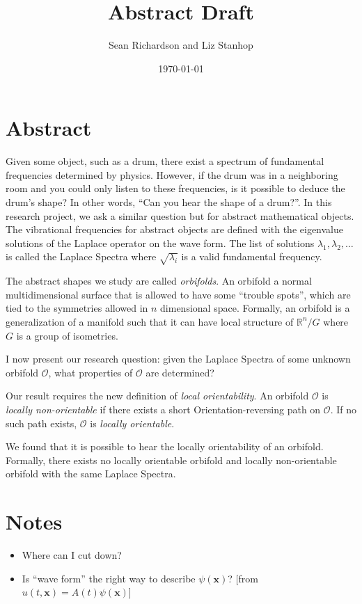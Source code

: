 \documentclass{article}
\begin{document}
\date{\today}
\title{Abstract Draft}
\author{Sean Richardson and Liz Stanhop}
\maketitle

\section{Abstract}

\hspace{\parindent} Given some object, such as a drum, there exist a spectrum
of fundamental frequencies determined by physics. However, if the drum was in a
neighboring room and you could only listen to these frequencies, is it possible
to deduce the drum's shape? In other words, ``Can you hear the shape of a
drum?''. In this research project, we ask a similar question but for abstract
mathematical objects. The vibrational frequencies for abstract objects are
defined with the eigenvalue solutions of the Laplace operator on the wave form.
The list of solutions $\lambda_1, \lambda_2, \dots$ is called the Laplace
Spectra where $\sqrt{\lambda_i}$ is a valid fundamental frequency. 

The abstract shapes we study are called \emph{orbifolds}. An orbifold a normal multidimensional surface that is allowed to have some ``trouble spots'', which are tied to the symmetries allowed in $n$ dimensional space. Formally, an orbifold is a generalization of a manifold such that it can have local structure of $\mathbb{R}^n/G$ where $G$ is a group of isometries.

I now present our research question: given the Laplace Spectra of some unknown orbifold $\mathcal{O}$, what properties of $\mathcal{O}$ are determined?

Our result requires the new definition of \emph{local orientability}. An orbifold $\mathcal{O}$ is \emph{locally non-orientable} if there exists a short Orientation-reversing path on $\mathcal{O}$. If no such path exists, $\mathcal{O}$ is \emph{locally orientable}.

We found that it is possible to hear the locally orientability of an orbifold. Formally, there exists no locally orientable orbifold and locally non-orientable orbifold with the same Laplace Spectra.

\section{Notes}
\begin{itemize}
    \item Where can I cut down?
    \item Is ``wave form'' the right way to describe $\psi(\mathbf{x})$? [from $u(t,\mathbf{x}) = A(t)\psi({\mathbf{x}})$]
\end{itemize}
\end{document}

